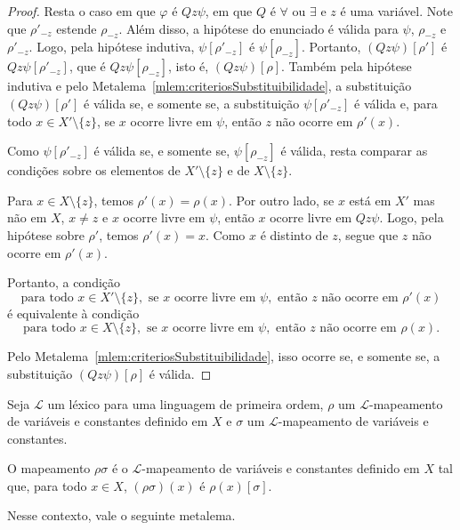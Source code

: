 \begin{proof}
    Resta o caso em que $\varphi$ é $Qz\psi$, em que $Q$ é $\forall$ ou $\exists$ e $z$ é uma variável.
    Note que $\rho'_{-z}$ estende $\rho_{-z}$.
    Além disso, a hipótese do enunciado é válida para $\psi$, $\rho_{-z}$ e $\rho'_{-z}$.
    Logo, pela hipótese indutiva, $\psi[\rho'_{-z}]$ é $\psi[\rho_{-z}]$.
    Portanto, $(Qz\psi)[\rho']$ é $Qz\psi[\rho'_{-z}]$, que é $Qz\psi[\rho_{-z}]$, isto é, $(Qz\psi)[\rho]$.
    Também pela hipótese indutiva e pelo Metalema~\ref{mlem:criteriosSubstituibilidade}, a substituição $(Qz\psi)[\rho']$ é válida se, e somente se, a substituição $\psi[\rho'_{-z}]$ é válida e, para todo $x\in X'\setminus\{z\}$, se $x$ ocorre livre em $\psi$, então $z$ não ocorre em $\rho'(x)$.

    Como $\psi[\rho'_{-z}]$ é válida se, e somente se, $\psi[\rho_{-z}]$ é válida, resta comparar as condições sobre os elementos de $X'\setminus\{z\}$ e de $X\setminus\{z\}$.

    Para $x\in X\setminus\{z\}$, temos $\rho'(x)=\rho(x)$.
    Por outro lado, se $x$ está em $X'$ mas não em $X$, $x\neq z$ e $x$ ocorre livre em $\psi$, então $x$ ocorre livre em $Qz\psi$.
    Logo, pela hipótese sobre $\rho'$, temos $\rho'(x)=x$.
    Como $x$ é distinto de $z$, segue que $z$ não ocorre em $\rho'(x)$.

    Portanto, a condição
    \[
        \text{para todo }x\in X'\setminus\{z\},\text{ se }x\text{ ocorre livre em }\psi,\text{ então }z\text{ não ocorre em }\rho'(x)
    \]
    é equivalente à condição
    \[
        \text{para todo }x\in X\setminus\{z\},\text{ se }x\text{ ocorre livre em }\psi,\text{ então }z\text{ não ocorre em }\rho(x).
    \]

    Pelo Metalema~\ref{mlem:criteriosSubstituibilidade}, isso ocorre se, e somente se, a substituição $(Qz\psi)[\rho]$ é válida.
\end{proof}

\begin{convention}
    Seja $\mathcal L$ um léxico para uma linguagem de primeira ordem, $\rho$ um $\mathcal L$-mapeamento de variáveis e constantes definido em $X$ e $\sigma$ um $\mathcal L$-mapeamento de variáveis e constantes.

    O mapeamento $\rho\sigma$ é o $\mathcal L$-mapeamento de variáveis e constantes definido em $X$ tal que, para todo $x\in X$, $(\rho\sigma)(x)$ é $\rho(x)[\sigma]$.
\end{convention}

Nesse contexto, vale o seguinte metalema.

